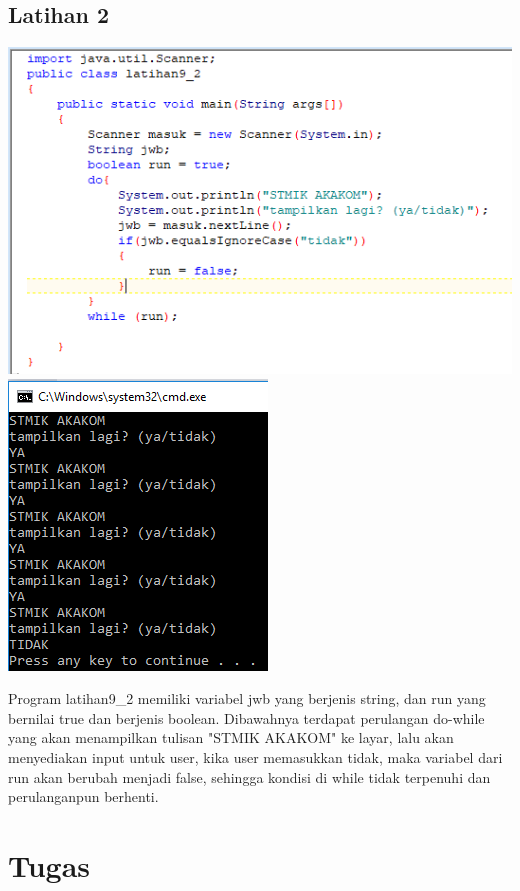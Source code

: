 \documentclass[a4paper,12pt]{article}
\begin{document}
\subsection{Latihan 2}
\begin{center}
	\includegraphics[scale=1]{Capture7}
	\includegraphics[scale=1]{Capture7_2}
\end{center}
Program latihan9\_2 memiliki variabel jwb yang berjenis string, dan run yang bernilai true dan berjenis boolean. Dibawahnya terdapat perulangan do-while yang akan menampilkan tulisan "STMIK AKAKOM"  ke layar, lalu akan menyediakan input untuk user, kika user memasukkan tidak, maka variabel dari run akan berubah menjadi false, sehingga kondisi di while tidak terpenuhi dan perulanganpun berhenti.

\section{Tugas}
\end{document}
